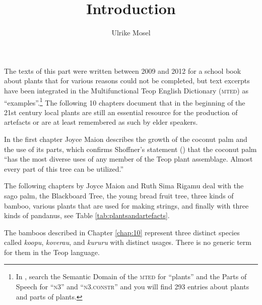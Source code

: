 \documentclass[output=paper]{langscibook}
\title{Introduction}
\author{Ulrike Mosel}
\begin{document}
\maketitle\label{chap:4}
The texts of this part were written between 2009 and 2012 for a school book about plants that for various reasons could not be completed, but text excerpts have been integrated in the Multifunctional Teop English Dictionary (\textsc{mted}) as ``examples''.\footnote{In \textcite{Mosel:2019bt}, search the Semantic Domain of the \textsc{mted} for ``plants'' and the Parts of Speech for ``\textsc{n}3'' and ``\textsc{n}3.\textsc{constr}'' and you will find 293 entries about plants and parts of plants.} The following 10 chapters document that in the beginning of the 21st century local plants are still an essential resource for the production of artefacts or are at least remembered as such by elder speakers.

In the first chapter Joyce Maion describes the growth of the coconut palm and the use of its parts, which confirms Shoffner's statement (\citeyear[284]{Shoffner:1976eg}) that the coconut palm ``has the most diverse uses of any member of the Teop plant assemblage. Almost every part of this tree can be utilized.'' 


The following chapters by Joyce Maion and Ruth Sima Rigamu deal with the sago palm, the Blackboard Tree, the young bread fruit tree, three kinds of bamboo, various plants that are used for making strings, and finally with three kinds of pandanus, see Table \ref{tab:plantsandartefacts}.

The bamboos described in Chapter \ref{chap:10} represent three distinct species called \textit{koopu}, \textit{koverau}, and \textit{kururu} with distinct usages. There is no generic term for them in the Teop language.
\end{document}
